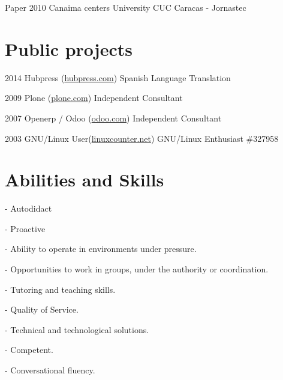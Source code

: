\documentclass{tccv}
\begin{document}
\begin{cyp}

\item[Paper]{2010}
     {Canaima centers University}
     {CUC Caracas - Jornastec} 

\end{cyp}

\section{Public projects}

\begin{proyectos}

\item{2014}
     {Hubpress (\href{https://www.hubpress.com/}{hubpress.com})}
     {Spanish Language Translation}

\item{2009}
     {Plone (\href{https://plone.org/support/providers/javier-leon}{plone.com})}
     {Independent Consultant}

\item{2007}
     {Openerp / Odoo (\href{http://www.odoo.com/}{odoo.com})}
     {Independent Consultant}

\item{2003}
     {GNU/Linux User(\href{http://linuxcounter.net/user/327958.html}{linuxcounter.net})}
     {GNU/Linux Enthusiast \#327958}
 
\end{proyectos}

\section{Abilities and Skills}

\begin{habilidades}

\item{- Autodidact} \\ 
\item{- Proactive} \\ 
\item{- Ability to operate in environments under pressure.} \\
\item{- Opportunities to work in groups, under the authority or coordination.} \\
\item{- Tutoring and teaching skills.} \\
\item{- Quality of Service.} \\
\item{- Technical and technological solutions.} \\
\item{- Competent.} \\
\item{- Conversational fluency.} \\

\end{habilidades}
\end{document}
